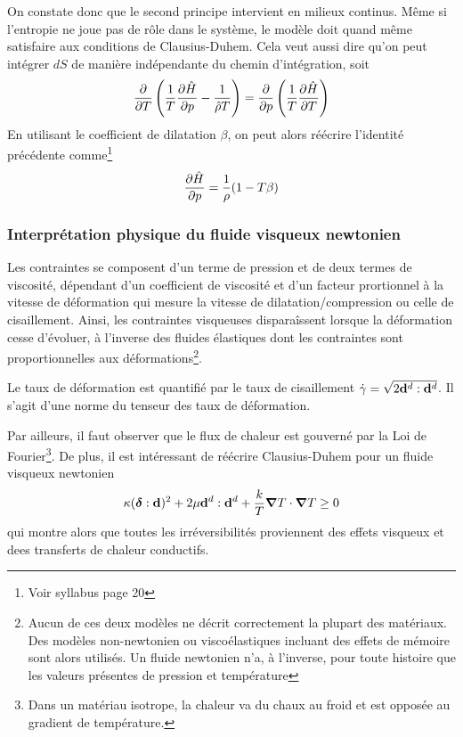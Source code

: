       On constate donc que le second principe intervient en milieux continus. Même si l'entropie ne joue pas de rôle dans le système, le modèle doit quand même satisfaire aux conditions de Clausius-Duhem. Cela veut aussi dire qu'on peut intégrer $dS$ de manière indépendante du chemin d'intégration, soit
      \begin{equation}
        \pdv{T}\left(\frac{1}{T}\pdv{\hat{H}}{p} - \frac{1}{\hat{\rho}T}\right) = \pdv{p}\left(\frac{1}{T}\pdv{\hat{H}}{T}\right)
      \end{equation}
      En utilisant le coefficient de dilatation $\beta$, on peut alors réécrire l'identité précédente comme\footnote{Voir syllabus page 20}
      \begin{equation}
        \pdv{\hat{H}}{p} = \frac{1}{\rho}(1-T\beta)\label{eq:dHdpbeta}
      \end{equation}

      \subsubsection{Interprétation physique du fluide visqueux newtonien}
        Les contraintes se composent d'un terme de pression et de deux termes de viscosité, dépendant d'un coefficient de viscosité et d'un facteur prortionnel à la vitesse de déformation qui mesure la vitesse de dilatation/compression ou celle de cisaillement. Ainsi, les contraintes visqueuses disparaîssent lorsque la déformation cesse d'évoluer, à l'inverse des fluides élastiques dont les contraintes sont proportionnelles aux déformations\footnote{Aucun de ces deux modèles ne décrit correctement la plupart des matériaux. Des modèles non-newtonien ou viscoélastiques incluant des effets de mémoire sont alors utilisés. Un fluide newtonien n'a, à l'inverse, pour toute histoire que les valeurs présentes de pression et température}.

        Le taux de déformation est quantifié par le taux de cisaillement $\dot{\gamma} = \sqrt{2\vb{d}^d:\vb{d}^d}$. Il s'agit d'une norme du tenseur des taux de déformation.

        Par ailleurs, il faut observer que le flux de chaleur est gouverné par la Loi de Fourier\footnote{Dans un matériau isotrope, la chaleur va du chaux au froid et est opposée au gradient de température.}. De plus, il est intéressant de réécrire Clausius-Duhem pour un fluide visqueux newtonien
        \begin{equation}
          \kappa (\boldsymbol{\delta}:\vb{d})^2 + 2 \mu \vb{d}^d : \vb{d}^d + \frac{k}{T}\grad T \cdot \grad T \geq 0
        \end{equation}
        qui montre alors que toutes les irréversibilités proviennent des effets visqueux et dees transferts de chaleur conductifs.


